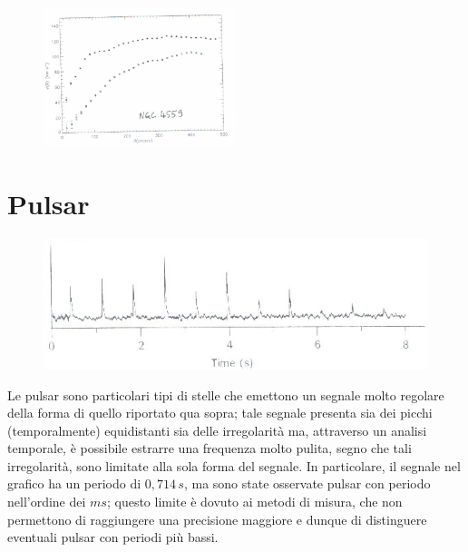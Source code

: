 \begin{figure}[h!]
	\centering
	\includegraphics[width=0.5\textwidth]{Img/bertin_7bis.png}
\end{figure}

\section{Pulsar}

\begin{figure}[h!]
	\centering
	\includegraphics[width=1\textwidth]{Img/bertin_8.png}
\end{figure}

Le pulsar sono particolari tipi di stelle che emettono un segnale molto regolare della forma di quello riportato qua sopra; tale segnale presenta sia dei picchi (temporalmente) equidistanti sia delle irregolarità ma, attraverso un analisi temporale, è possibile estrarre una frequenza molto pulita, segno che tali irregolarità, sono limitate alla sola forma del segnale. In particolare, il segnale nel grafico ha un periodo di $0,714 \, s$, ma sono state osservate pulsar con periodo nell'ordine dei $ms$; questo limite è dovuto ai metodi di misura, che non permettono di raggiungere una precisione maggiore e dunque di distinguere eventuali pulsar con periodi più bassi.
\\

